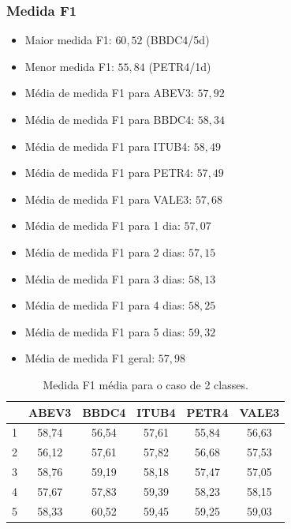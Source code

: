 \documentclass[grad,numbers]{coppe}
\begin{document}
		 			\subsubsection{Medida F1}
						\begin{itemize}
							\item Maior medida F1: $60,52$ (BBDC4/5d)
							\item Menor medida F1: $55,84$ (PETR4/1d)
							\item Média de medida F1 para ABEV3: $57,92$
							\item Média de medida F1 para BBDC4: $58,34$
							\item Média de medida F1 para ITUB4: $58,49$
							\item Média de medida F1 para PETR4: $57,49$
							\item Média de medida F1 para VALE3: $57,68$
							\item Média de medida F1 para 1 dia: $57,07$
							\item Média de medida F1 para 2 dias: $57,15$
							\item Média de medida F1 para 3 dias: $58,13$
							\item Média de medida F1 para 4 dias: $58,25$
							\item Média de medida F1 para 5 dias: $59,32$
							\item Média de medida F1 geral: $57,98$
						\end{itemize}
			 			\begin{table}[h]
			 				\caption{Medida F1 média para o caso de 2 classes.}
			 				\label{tab:2c_f1_analysis}
			 				\centering
			 				{\footnotesize
			 					\begin{tabular}{|c|c|c|c|c|c|}
			 						\hline
			 						\diagbox[linewidth=0.2pt, width=\dimexpr \textwidth/10+2\tabcolsep\relax, height=0.8cm]{Dias}{Ativo}
			 						& ABEV3 & BBDC4 & ITUB4 & PETR4 & VALE3\\
			 						\hline
			 						1 & 58,74 & 56,54 & 57,61 & 55,84 & 56,63 \\
			 						2 & 56,12 & 57,61 & 57,82 & 56,68 & 57,53 \\
			 						3 & 58,76 & 59,19 & 58,18 & 57,47 & 57,05 \\
			 						4 & 57,67 & 57,83 & 59,39 & 58,23 & 58,15 \\
			 						5 & 58,33 & 60,52 & 59,45 & 59,25 & 59,03 \\
			 						\hline
			 				\end{tabular}}
			 			\end{table}
		 			\newpage
\end{document}
